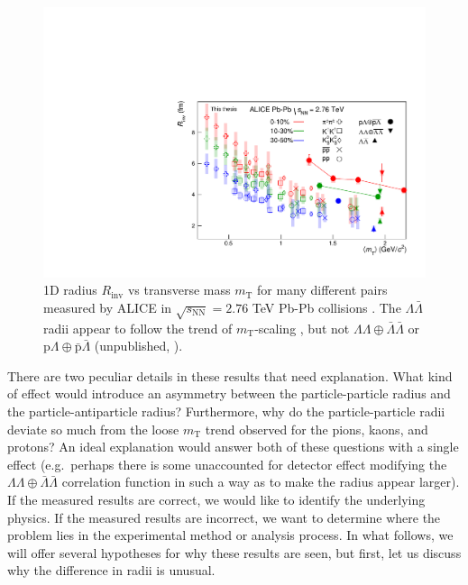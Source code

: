 \begin{figure}[hbtp]
\includegraphics[width=36pc]{Figures/FitResults/2016-09-29-mTscaling.pdf}
\caption[$R_{\mathrm{inv}}$ vs $m_{\mathrm{T}}$]{1D radius $R_\mathrm{inv}$ vs transverse mass $m_\mathrm{T}$ for many different pairs measured by ALICE in $\sqrt{s_\mathrm{NN}} = 2.76$ TeV Pb-Pb collisions \cite{Adam:2015vja}.
The $\Lambda\bar{\Lambda}$ radii appear to follow the trend of $m_\mathrm{T}$-scaling \cite{Csorgo:1995bi,Lisa:2005dd}, but not $\Lambda\Lambda\oplus\bar{\Lambda}\bar{\Lambda}$ or $\mathrm{p}\Lambda\oplus\bar{\mathrm{p}}\bar{\Lambda}$ (unpublished, \cite{Beck:2015msi}).
}
\label{fig:RvsMt}
\end{figure}

There are two peculiar details in these results that need explanation.
What kind of effect would introduce an asymmetry between the particle-particle radius and the particle-antiparticle radius? 
Furthermore, why do the particle-particle radii deviate so much from the loose $m_\mathrm{T}$ trend observed for the pions, kaons, and protons?
An ideal explanation would answer both of these questions with a single effect (e.g.\ perhaps there is some unaccounted for detector effect modifying the $\Lambda\Lambda\oplus\bar{\Lambda}\bar{\Lambda}$ correlation function in such a way as to make the radius appear larger).
If the measured results are correct, we would like to identify the underlying physics.
If the measured results are incorrect, we want to determine where the problem lies in the experimental method or analysis process.
In what follows, we will offer several hypotheses for why these results are seen, but first, let us discuss why the difference in radii is unusual.

